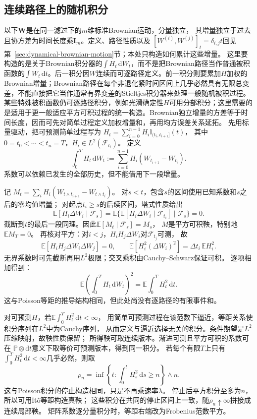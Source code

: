 \subsection{连续路径上的随机积分}
以下$\bm W$是在同一滤过下的$m$维标准Brownian运动，分量独立，
其增量独立于过去且协方差为时间长度乘$\bm I_m$。定义、路径性质以及
$[W^{(i)},W^{(j)}]_t=\delta_{i,j}t$回见
第~\ref{sec:dynamical-brownian-motion}节；本处只构造如何累计这些增量。
这里要构造的是关于Brownian积分器的\(\int H_t\,\mathrm dW_t\)，而不是把Brownian路径当作普通被积函数的\(\int W_t\,\mathrm dt\)。后一积分因\(W\)连续而可逐路径定义。前一积分则要累加\(H\)加权的Brownian增量；Brownian路径在每个非退化紧时间区间上几乎必然具有无限总变差，不能直接把它当作通常有界变差的Stieltjes积分器来处理一般随机被积过程。某些特殊被积函数仍可逐路径积分，例如光滑确定性\(H\)可用分部积分；这里需要的是适用于更一般适应平方可积过程的统一构造。Brownian独立增量的方差等于时间长度，因而可先对简单过程定义加权增量和，再用均方误差关系延拓。
先用标量驱动，把可预测简单过程写为
$H_t=\sum_{i=0}^{n-1}H_i\mathbb I_{(t_i,t_{i+1}]}(t)$，
其中$0=t_0<\cdots<t_n=T$，$H_i\in L^2(\mathcal F_{t_i})$。
定义
\begin{equation}
  \int_0^T H_t\,\mathrm dW_t
       :=\sum_{i=0}^{n-1}H_i(W_{t_{i+1}}-W_{t_i}).
  \label{eq:dynamical-simple-ito-integral}
\end{equation}
系数可以依赖已发生的全部历史，但不能借用下一段增量。

记
$M_t=\sum_iH_i(W_{t\wedge t_{i+1}}-W_{t\wedge t_i})$。
对$s<t$，包含$s$的区间使用已知系数和$s$之后的零均值增量；
对起点$t_i\geq s$的后续区间，塔式性质给出
\[
  \mathbb E[H_i\Delta W_i\mid\mathcal F_s]
   =\mathbb E\{\mathbb E[H_i\Delta W_i\mid\mathcal F_{t_i}]
                  \mid\mathcal F_s\}=0.
\]
截断到$t$的最后一段同理。因此$\mathbb E[M_t\mid\mathcal F_s]=M_s$，
$M$是平方可积鞅，特别地$\mathbb E M_T=0$。
再核对平方：对$i<j$，$H_iH_j\Delta W_i$对$\mathcal F_{t_j}$可测，
故
\[
  \mathbb E[H_iH_j\Delta W_i\Delta W_j]=0,\qquad
  \mathbb E[H_i^2(\Delta W_i)^2]=\Delta t_i\,\mathbb E H_i^2.
\]
无界系数时可先截断再用$L^2$极限；交叉乘积由Cauchy--Schwarz保证可积。
逐项相加得到：
\begin{equation}
  \mathbb E\left(\int_0^T H_t\,\mathrm dW_t\right)^2
       =\mathbb E\int_0^T H_t^2\,\mathrm dt.
  \label{eq:dynamical-ito-isometry}
\end{equation}
这与Poisson等距的推导结构相同，但此处尚没有逐路径的有限事件和。

对可预测$H$，若$\mathbb E\int_0^T H_t^2\,\mathrm dt<\infty$，
用简单可预测过程在该范数下逼近，等距关系使积分序列在$L^2$中为Cauchy序列，
从而定义与逼近选择无关的积分。条件期望是$L^2$压缩映射，故鞅性质保留；
所得鞅可取连续版本。渐进可测且平方可积的系数可在
$\mathbb P\otimes\mathrm dt$意义下取等价可预测版本，得到同一积分。
若每个有限$T$上只有$\int_0^T H_t^2\,\mathrm dt<\infty$几乎必然，则取
\[
 \rho_n=\inf\left\{t:\int_0^tH_s^2\,\mathrm ds\geq n\right\}\wedge n.
\]
这与Poisson积分的停止构造相同，只是不再乘速率$\lambda$。
停止后平方积分至多为$n$，所以可用Itô等距构造真鞅；
这些积分在共同的停止区间上一致，随$\rho_n\uparrow\infty$拼接成连续局部鞅。
矩阵系数逐分量积分时，等距右端改为Frobenius范数平方。

